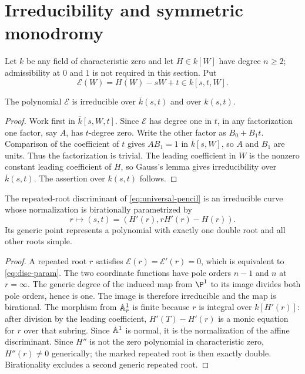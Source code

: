 \section{Irreducibility and symmetric monodromy}\label{sec:monodromy}

Let $k$ be any field of characteristic zero and let $H\in k[W]$ have degree
$n\ge2$; admissibility at $0$ and $1$ is not required in this section.  Put
\begin{equation}\label{eq:universal-pencil}
 \mathscr E(W)=H(W)-sW+t\in k[s,t,W].
\end{equation}

\begin{proposition}\label{prop:pencil-irreducible}
The polynomial $\mathscr E$ is irreducible over $\overline{k}(s,t)$ and over
$k(s,t)$.
\end{proposition}

\begin{proof}
Work first in $\overline{k}[s,W,t]$.  Since $\mathscr E$ has degree one in
$t$, in any factorization one factor, say $A$, has $t$-degree zero.  Write the
other factor as $B_0+B_1t$.  Comparison of the coefficient of $t$ gives
$AB_1=1$ in $\overline{k}[s,W]$, so $A$ and $B_1$ are units.  Thus the
factorization is trivial.  The leading coefficient in $W$ is the nonzero
constant leading coefficient of $H$, so Gauss's lemma gives irreducibility
over $\overline{k}(s,t)$.  The assertion over $k(s,t)$ follows.
\end{proof}

\begin{proposition}\label{prop:universal-disc}
The repeated-root discriminant of \eqref{eq:universal-pencil} is an
irreducible curve whose normalization is birationally parametrized by
\begin{equation}\label{eq:disc-param}
 r\longmapsto\left(s,t\right)=\left(H'(r),rH'(r)-H(r)\right).
\end{equation}
Its generic point represents a polynomial with exactly one double root and
all other roots simple.
\end{proposition}

\begin{proof}
A repeated root $r$ satisfies $\mathscr E(r)=\mathscr E'(r)=0$, which is
equivalent to \eqref{eq:disc-param}.  The two coordinate functions have pole
orders $n-1$ and $n$ at $r=\infty$.  The generic degree of the induced map
from $\P^1$ to its image divides both pole orders, hence is one.  The image is
therefore irreducible and the map is birational.  The morphism from $\mathbb A^1_r$
is finite because $r$ is integral over $k[H'(r)]$: after division by the
leading coefficient, $H'(T)-H'(r)$ is a monic equation for $r$ over that
subring.  Since $\mathbb A^1$ is normal, it is the normalization of the affine
discriminant.  Since $H''$ is not the zero
polynomial in characteristic zero, $H''(r)\ne0$ generically; the marked
repeated root is then exactly double.  Birationality excludes a second
generic repeated root.
\end{proof}

